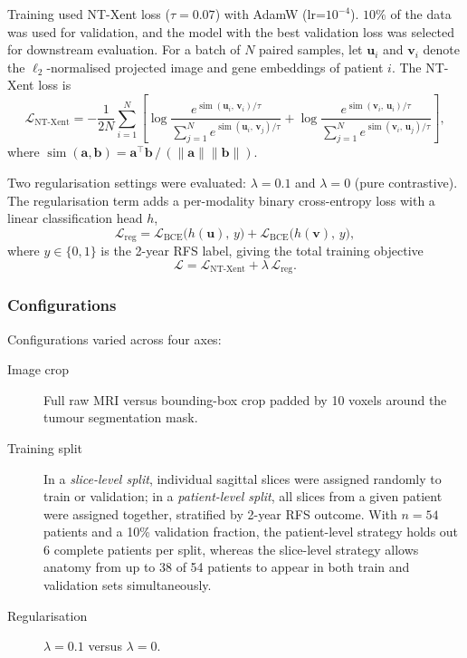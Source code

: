 \documentclass[12pt,twoside]{report}
\begin{document}
Training used NT-Xent loss ($\tau = 0.07$) with AdamW (lr=$10^{-4}$). $10\%$ of the data was used for validation, and the model with the best validation loss was selected for downstream evaluation.
For a batch of $N$ paired samples, let $\mathbf{u}_i$ and $\mathbf{v}_i$ denote the
$\ell_2$-normalised projected image and gene embeddings of patient $i$.
The NT-Xent loss is
\begin{equation}
\mathcal{L}_{\text{NT-Xent}} = -\frac{1}{2N} \sum_{i=1}^{N} \left[
  \log \frac{e^{\operatorname{sim}(\mathbf{u}_i,\,\mathbf{v}_i)/\tau}}
            {\sum_{j=1}^{N} e^{\operatorname{sim}(\mathbf{u}_i,\,\mathbf{v}_j)/\tau}}
+ \log \frac{e^{\operatorname{sim}(\mathbf{v}_i,\,\mathbf{u}_i)/\tau}}
            {\sum_{j=1}^{N} e^{\operatorname{sim}(\mathbf{v}_i,\,\mathbf{u}_j)/\tau}}
\right],
\label{eq:ntxent}
\end{equation}
where $\operatorname{sim}(\mathbf{a},\mathbf{b}) = \mathbf{a}^\top\mathbf{b}\,/\,(\|\mathbf{a}\|\|\mathbf{b}\|)$.

Two regularisation settings were evaluated: $\lambda = 0.1$ and $\lambda = 0$ (pure contrastive).
The regularisation term adds a per-modality binary cross-entropy loss with a linear classification head $h$,
\begin{equation}
\mathcal{L}_{\text{reg}} =
  \mathcal{L}_{\text{BCE}}\!\bigl(h(\mathbf{u}),\,y\bigr)
+ \mathcal{L}_{\text{BCE}}\!\bigl(h(\mathbf{v}),\,y\bigr),
\label{eq:reg}
\end{equation}
where $y \in \{0,1\}$ is the 2-year RFS label, giving the total training objective
\begin{equation}
\mathcal{L} = \mathcal{L}_{\text{NT-Xent}} + \lambda\,\mathcal{L}_{\text{reg}}.
\label{eq:total}
\end{equation}

\subsubsection*{Configurations}

Configurations varied across four axes:
\begin{description}
  \item[Image crop] Full raw MRI versus bounding-box crop padded by 10 voxels around
    the tumour segmentation mask.

  \item[Training split] In a \textit{slice-level split}, individual sagittal slices were
    assigned randomly to train or validation; in a \textit{patient-level split}, all slices
    from a given patient were assigned together, stratified by 2-year RFS outcome.
    With $n=54$ patients and a 10\% validation fraction, the patient-level strategy holds out
    6 complete patients per split, whereas the slice-level strategy allows anatomy from up to
    38 of 54 patients to appear in both train and validation sets simultaneously.
  \item[Regularisation] $\lambda = 0.1$ versus $\lambda = 0$. 

\end{description}
\end{document}
